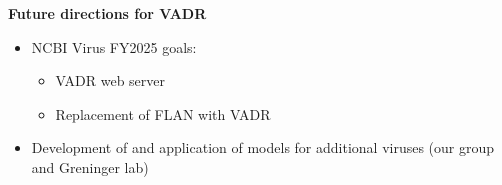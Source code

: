 \documentclass[landscape]{slides}
\begin{document}
\begin{slide}
\begin{center}
  \textbf{Future directions for VADR}
\end{center}

  \begin{itemize}
  \item NCBI Virus FY2025 goals: 
    \begin{itemize}
    \item VADR web server
    \item Replacement of FLAN with VADR
    \end{itemize}

  \item Development of and application of models for additional
    viruses (our group and Greninger lab)
  \end{itemize}
  \vfill

\end{slide}
\begin{slide}
\end{slide}
\end{document}
